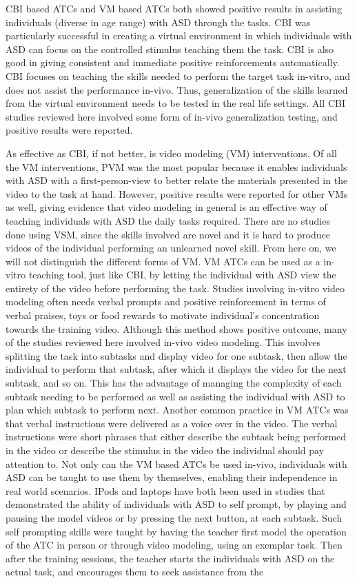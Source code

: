CBI based ATCs and VM based ATCs both showed positive results in assisting individuals (diverse in age range) with ASD through the tasks.  CBI was particularly successful in creating a virtual environment in which individuals with ASD can focus on the controlled stimulus teaching them the task.  CBI is also good in giving consistent and immediate positive reinforcements automatically.  CBI focuses on teaching the skills needed to perform the target task in-vitro, and does not assist the performance in-vivo.  Thus, generalization of the skills learned from the virtual environment needs to be tested in the real life settings.  All CBI studies reviewed here involved some form of in-vivo generalization testing, and positive results were reported.

As effective as CBI, if not better, is video modeling (VM) interventions.  Of all the VM interventions, PVM was the most popular because it enables individuals with ASD with a first-person-view to better relate the materials presented in the video to the task at hand. However, positive results were reported for other VMs as well, giving evidence that video modeling in general is an effective way of teaching individuals with ASD the daily tasks required. There are no studies done using VSM, since the skills involved are novel and it is hard to produce videos of the individual performing an unlearned novel skill. From here on, we will not distinguish the different forms of VM. VM ATCs can be used as a in-vitro teaching tool, just like CBI, by letting the individual with ASD view the entirety of the video before performing the task. Studies involving in-vitro video modeling often needs verbal prompts and positive reinforcement in terms of verbal praises, toys or food rewards to motivate individual's concentration towards the training video. Although this method shows positive outcome, many of the studies reviewed here involved in-vivo video modeling.  This involves splitting the task into subtasks and display video for one subtask, then allow the individual to perform that subtask, after which it displays the video for the next subtask, and so on. This has the advantage of managing the complexity of each subtask needing to be performed as well as assisting the individual with ASD to plan which subtask to perform next.  Another common practice in VM ATCs was that verbal instructions were delivered as a voice over in the video.  The verbal instructions were short phrases that either describe the subtask being performed in the video or describe the stimulus in the video the individual should pay attention to.  Not only can the VM based ATCs be used in-vivo, individuals with ASD can be taught to use them by themselves, enabling their independence in real world scenarios.  IPods and laptops have both been used in studies that demonstrated the ability of individuals with ASD to self prompt, by playing and pausing the model videos or by pressing the next button, at each subtask.  Such self prompting skills were taught by having the teacher first model the operation of the ATC in person or through video modeling, using an exemplar task.  Then after the training sessions, the teacher starts the individuals with ASD on the actual task, and encourages them to seek assistance from the 
